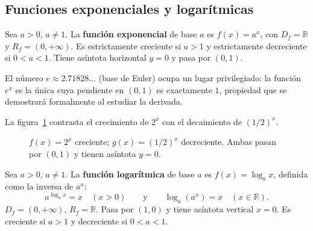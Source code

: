 \subsection{Funciones exponenciales y logarítmicas}

\begin{definition}
Sea $a > 0$, $a \neq 1$. La \textbf{función exponencial} de base $a$ es $f(x) = a^x$, con $D_f = \mathbb{R}$ y $R_f = (0,+\infty)$. Es estrictamente creciente si $a > 1$ y estrictamente decreciente si $0 < a < 1$. Tiene asíntota horizontal $y = 0$ y pasa por $(0,1)$.

El número $e \approx 2.71828\ldots$ (base de Euler) ocupa un lugar privilegiado: la función $e^x$ es la única cuya pendiente en $(0,1)$ es exactamente $1$, propiedad que se demostrará formalmente al estudiar la derivada.
\end{definition}

\begin{example}
La figura~\ref{fig:exponenciales} contrasta el crecimiento de $2^x$ con el
decaimiento de $(1/2)^x$.
\begin{figure}[!htbp]
\centering
{}
\caption{$f(x)=2^x$ creciente; $g(x)=(1/2)^x$ decreciente. Ambas pasan por $(0,1)$ y tienen asíntota $y=0$.}
\label{fig:exponenciales}
\end{figure}
\end{example}


\begin{definition}
Sea $a > 0$, $a \neq 1$. La \textbf{función logarítmica} de base $a$ es $f(x) = \log_a x$, definida como la inversa de $a^x$:
\[
  a^{\log_a x} = x \quad (x > 0) \qquad \text{y} \qquad \log_a(a^x) = x \quad (x \in \mathbb{R}).
\]
$D_f = (0,+\infty)$, $R_f = \mathbb{R}$. Pasa por $(1,0)$ y tiene asíntota vertical $x = 0$. Es creciente si $a > 1$ y decreciente si $0 < a < 1$.
\end{definition}

